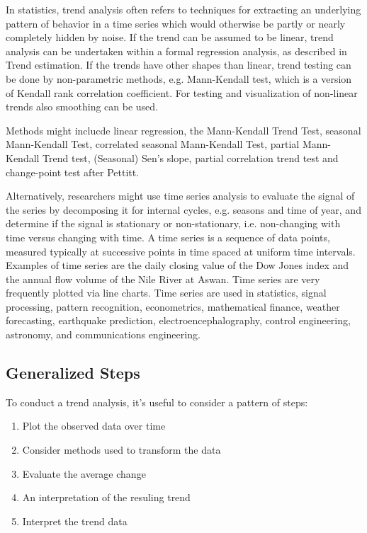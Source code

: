 \documentclass{article}\usepackage[]{graphicx}\usepackage[]{color}
\begin{document}
In statistics, trend analysis often refers to techniques for extracting an underlying pattern of behavior in a time series which would otherwise be partly or nearly completely hidden by noise. If the trend can be assumed to be linear, trend analysis can be undertaken within a formal regression analysis, as described in Trend estimation. If the trends have other shapes than linear, trend testing can be done by non-parametric methods, e.g. Mann-Kendall test, which is a version of Kendall rank correlation coefficient. For testing and visualization of non-linear trends also smoothing can be used.

Methods might inclucde linear regression, the Mann-Kendall Trend Test, seasonal Mann-Kendall Test, correlated seasonal Mann-Kendall Test, partial Mann-Kendall Trend test, (Seasonal) Sen's slope, partial correlation trend test and change-point test after Pettitt.

Alternatively, researchers might use time series analysis to evaluate the signal of the series by decomposing it for internal cycles, e.g. seasons and time of year, and determine if the signal is stationary or non-stationary, i.e. non-changing with time versus changing with time. A time series is a sequence of data points, measured typically at successive points in time spaced at uniform time intervals. Examples of time series are the daily closing value of the Dow Jones index and the annual flow volume of the Nile River at Aswan. Time series are very frequently plotted via line charts. Time series are used in statistics, signal processing, pattern recognition, econometrics, mathematical finance, weather forecasting, earthquake prediction, electroencephalography, control engineering, astronomy, and communications engineering.

\subsection{Generalized Steps}

To conduct a trend analysis, it's useful to consider a pattern of steps:

\begin{enumerate}
  \item Plot the observed data over time
  \item Consider methods used to transform the data
  \item Evaluate the average change
  \item An interpretation of the resuling trend
  \item Interpret the trend data
\end{enumerate}
\end{document}
